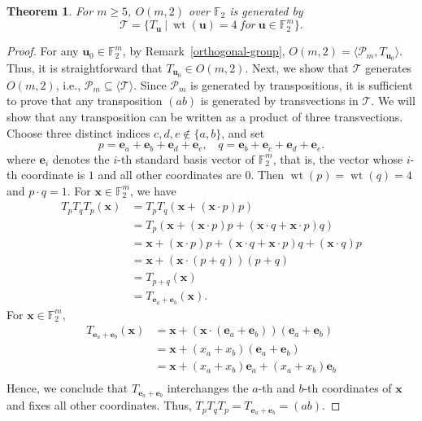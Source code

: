\documentclass{article}
\newtheorem{theorem}{Theorem}
\newcommand{\wt}{\operatorname{wt}}
\begin{document}
\begin{theorem}\label{orthogonal-group-generator}
    For $m \geq 5$, $O(m,2)$ over $\mathbb{F}_2$ is generated by \[
    \mathcal{T} = \{T_\mathbf{u}~|~\wt(\mathbf{u})=4~for~\mathbf{u}\in\mathbb{F}_2^m\}.
    \]
\end{theorem}
\begin{proof}
    For any $\mathbf{u}_0 \in \mathbb{F}_2^m$, by Remark~\ref{orthogonal-group}, $O(m,2)=\langle\mathcal{P}_m, T_{\mathbf{u}_0}\rangle$. Thus, it is straightforward that $T_{\mathbf{u}_0} \in O(m,2)$.
    Next, we show that $\mathcal{T}$ generates $O(m,2)$, i.e., $\mathcal{P}_m \subseteq \langle\mathcal{T}\rangle$. Since $\mathcal{P}_m$ is generated by transpositions, it is sufficient to prove that any transposition $(ab)$ is generated by transvections in $\mathcal{T}$. We will show that any transposition can be written as a product of three transvections. Choose three distinct indices $c, d, e \notin \{a, b\}$, and set\[
    p=\mathbf{e}_a + \mathbf{e}_b + \mathbf{e}_d + \mathbf{e}_e,~~~~q=\mathbf{e}_b + \mathbf{e}_c + \mathbf{e}_d + \mathbf{e}_e.
    \] where $\mathbf{e}_i$ denotes the $i$-th standard basis vector of $\mathbb{F}_2^m$, that is, the vector whose $i$-th coordinate is $1$ and all other coordinates are $0$.
    Then $\wt(p)=\wt(q)=4$ and $p \cdot q = 1$. For $\mathbf{x} \in \mathbb{F}_2^m$, we have
\begin{align*}
    T_p T_q T_p(\mathbf{x}) &= T_p T_q(\mathbf{x} + (\mathbf{x} \cdot p)p)\\
    &= T_p (\mathbf{x} + (\mathbf{x} \cdot p)p + (\mathbf{x} \cdot q + \mathbf{x} \cdot p)q)\\
    &= \mathbf{x} + (\mathbf{x} \cdot p)p + (\mathbf{x} \cdot q + \mathbf{x} \cdot p)q + (\mathbf{x} \cdot q)p\\
    &= \mathbf{x} + (\mathbf{x} \cdot (p+q))(p+q)\\
    &= T_{p+q}(\mathbf{x})\\
    &= T_{\mathbf{e}_a+\mathbf{e}_b}(\mathbf{x}).
\end{align*}
For $\mathbf{x} \in \mathbb{F}_2^m$,
\begin{align*}
    T_{\mathbf{e}_a+\mathbf{e}_b}(\mathbf{x})&=\mathbf{x} + (\mathbf{x} \cdot (\mathbf{e}_a+\mathbf{e}_b))(\mathbf{e}_a+\mathbf{e}_b)\\
    &=\mathbf{x} + (x_a+x_b)(\mathbf{e}_a+\mathbf{e}_b)\\
    &=\mathbf{x} + (x_a+x_b)\mathbf{e}_a + (x_a+x_b)\mathbf{e}_b\\
\end{align*}
Hence, we conclude that $T_{\mathbf{e}_a+\mathbf{e}_b}$ interchanges the $a$-th and $b$-th coordinates of $\mathbf{x}$ and fixes all other coordinates.
Thus, $T_p T_q T_p = T_{\mathbf{e}_a+\mathbf{e}_b} = (ab)$.
\end{proof}
\end{document}
